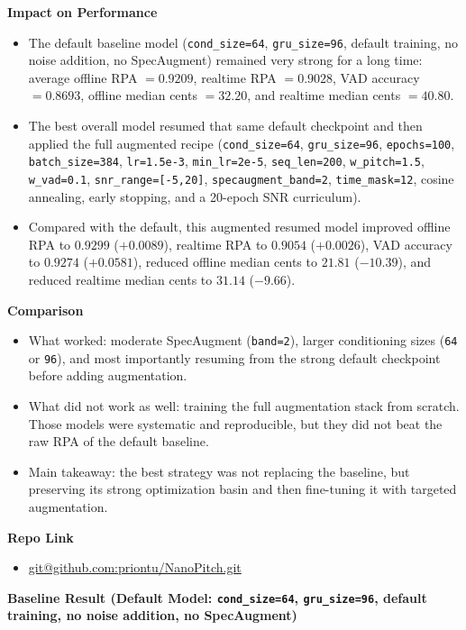 \documentclass[10pt]{article}
\begin{document}
\textbf{Impact on Performance}
\begin{itemize}
    \item The default baseline model (\texttt{cond\_size=64}, \texttt{gru\_size=96}, default training, no noise addition, no SpecAugment) remained very strong for a long time: average offline RPA \(=0.9209\), realtime RPA \(=0.9028\), VAD accuracy \(=0.8693\), offline median cents \(=32.20\), and realtime median cents \(=40.80\).
    \item The best overall model resumed that same default checkpoint and then applied the full augmented recipe (\texttt{cond\_size=64}, \texttt{gru\_size=96}, \texttt{epochs=100}, \texttt{batch\_size=384}, \texttt{lr=1.5e-3}, \texttt{min\_lr=2e-5}, \texttt{seq\_len=200}, \texttt{w\_pitch=1.5}, \texttt{w\_vad=0.1}, \texttt{snr\_range=[-5,20]}, \texttt{specaugment\_band=2}, \texttt{time\_mask=12}, cosine annealing, early stopping, and a 20-epoch SNR curriculum).
    \item Compared with the default, this augmented resumed model improved offline RPA to \(0.9299\) (\(+0.0089\)), realtime RPA to \(0.9054\) (\(+0.0026\)), VAD accuracy to \(0.9274\) (\(+0.0581\)), reduced offline median cents to \(21.81\) (\(-10.39\)), and reduced realtime median cents to \(31.14\) (\(-9.66\)).
\end{itemize}

\textbf{Comparison}
\begin{itemize}
    \item What worked: moderate SpecAugment (\texttt{band=2}), larger conditioning sizes (\texttt{64} or \texttt{96}), and most importantly resuming from the strong default checkpoint before adding augmentation.
    \item What did not work as well: training the full augmentation stack from scratch. Those models were systematic and reproducible, but they did not beat the raw RPA of the default baseline.
    \item Main takeaway: the best strategy was not replacing the baseline, but preserving its strong optimization basin and then fine-tuning it with targeted augmentation.
\end{itemize}

\textbf{Repo Link}
\begin{itemize}
    \item \url{git@github.com:priontu/NanoPitch.git}
\end{itemize}

\textbf{Baseline Result (Default Model: \texttt{cond\_size=64}, \texttt{gru\_size=96}, default training, no noise addition, no SpecAugment)}
\end{document}
